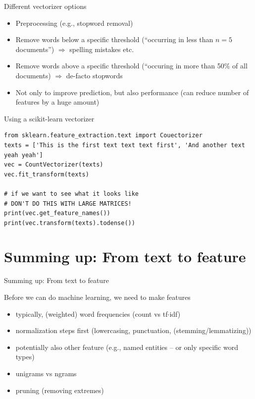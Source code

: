 \documentclass{beamer}
\begin{document}
\begin{frame}{Different vectorizer options}
\begin{itemize}
\item Preprocessing (e.g., stopword removal)
\item Remove words below a specific threshold (``occurring in less than $n=5$ documents'') $\Rightarrow$ spelling mistakes etc.
\item Remove words above a specific threshold (``occuring in more than 50\% of all documents) $\Rightarrow$ de-facto stopwords
\item Not only to improve prediction, but also performance (can reduce number of features by a huge amount)
\end{itemize}
\end{frame}


\begin{frame}[fragile]{Using a scikit-learn vectorizer}
\begin{lstlisting}
from sklearn.feature_extraction.text import Couectorizer
texts = ['This is the first text text text first', 'And another text yeah yeah']
vec = CountVectorizer(texts)
vec.fit_transform(texts) 

# if we want to see what it looks like
# DON'T DO THIS WITH LARGE MATRICES!
print(vec.get_feature_names())
print(vec.transform(texts).todense()) 
\end{lstlisting}
\end{frame}


\section{Summing up: From text to feature}

\begin{frame}[plain]
Summing up: From text to feature
\end{frame}

\begin{frame}{Before we can do machine learning, we need to make features}

\begin{itemize}[<+->]
	\item typically, (weighted) word frequencies (count vs tf$\cdot$idf)
	\item normalization steps first (lowercasing, punctuation, (stemming/lemmatizing))
	\item potentially also other feature (e.g., named entities -- or only specific word types)
	\item unigrams vs ngrams
	\item pruning (removing extremes)
\end{itemize}


\end{frame}
\end{document}
